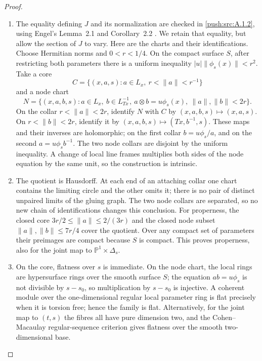 \begin{proof}
\begin{enumerate}[label=\arabic*.,leftmargin=*]
\item The equality defining $J$ and its normalization are checked in
\cref{push:src:A.1.2}, using Engel's Lemma~2.1 and Corollary~2.2 \cite{manEngel26}. We retain
that equality, but allow the section of $J$ to vary. Here are the
charts and their identifications. Choose Hermitian norms and
$0<r<1/4$. On the compact surface $S$, after restricting both
parameters there is a uniform inequality
$|u|\|\phi_s(x)\|<r^2$. Take a core
\[
 C=\{(x,a,s):a\in L_x,\ r<\|a\|<r^{-1}\}
\]
and a node chart
\[
 N=\{(x,a,b,s):a\in L_x,\ b\in L^{-1}_{Tx},\
           a\otimes b=u\phi_s(x),\ \|a\|,\|b\|<2r\}.
\]
On the collar $r<\|a\|<2r$, identify $N$ with $C$ by
$(x,a,b,s)\mapsto(x,a,s)$. On $r<\|b\|<2r$, identify it by
$(x,a,b,s)\mapsto(Tx,b^{-1},s)$. These maps and their inverses are
holomorphic; on the first collar $b=u\phi_s/a$, and on the second
$a=u\phi_s b^{-1}$. The two node collars are disjoint by the
uniform inequality. A change of local line frames multiplies both
sides of the node equation by the same unit, so the construction is
intrinsic.

\item The quotient is Hausdorff. At each end of an attaching collar one
chart contains the limiting circle and the other omits it; there is
no pair of distinct unpaired limits of the gluing graph. The two
node collars are separated, so no new chain of identifications
changes this conclusion. For properness, the closed core
$3r/2\leq\|a\|\leq2/(3r)$ and the closed node subset
$\|a\|,\|b\|\leq7r/4$ cover the quotient. Over any compact set
of parameters their preimages are compact because $S$ is compact.
This proves properness, also for the joint map to
$\mathbb P^1\times\Delta_s$.

\item On the core, flatness over $s$ is immediate. On the node chart, the
local rings are hypersurface rings over the smooth surface $S$;
the equation $ab=u\phi_s$ is not divisible by $s-s_0$, so
multiplication by $s-s_0$ is injective. A coherent module over the
one-dimensional regular local parameter ring is flat precisely
when it is torsion free; hence the family is flat. Alternatively,
for the joint map to $(t,s)$ the fibres all have pure dimension
two, and the Cohen--Macaulay regular-sequence criterion gives
flatness over the smooth two-dimensional base.


\end{enumerate}
\end{proof}
